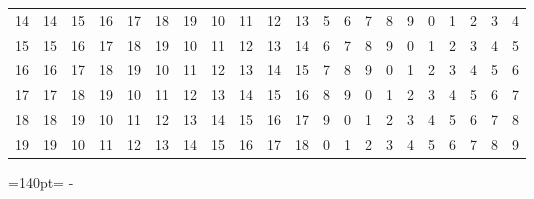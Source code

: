 \documentclass[10pt,a4paper]{article}
\newcommand{\needspace}[1]{\par\penalty-100\begingroup\dimen0=#1\relax\dimen2=\pagegoal
  \advance\dimen2-\pagetotal\ifdim\dimen0>\dimen2\relax\ifdim\dimen2>0pt\vfil\break\fi\fi
  \endgroup}
\numberwithin{equation}{section}
\begin{document}
{\begin{longtable}{@{}r|rrrrrrrrrrrrrrrrrrrr@{}}
14 & 14 & 15 & 16 & 17 & 18 & 19 & 10 & 11 & 12 & 13 & 5 & 6 & 7 & 8 & 9 & 0 & 1 & 2 & 3 & 4\\
15 & 15 & 16 & 17 & 18 & 19 & 10 & 11 & 12 & 13 & 14 & 6 & 7 & 8 & 9 & 0 & 1 & 2 & 3 & 4 & 5\\
16 & 16 & 17 & 18 & 19 & 10 & 11 & 12 & 13 & 14 & 15 & 7 & 8 & 9 & 0 & 1 & 2 & 3 & 4 & 5 & 6\\
17 & 17 & 18 & 19 & 10 & 11 & 12 & 13 & 14 & 15 & 16 & 8 & 9 & 0 & 1 & 2 & 3 & 4 & 5 & 6 & 7\\
18 & 18 & 19 & 10 & 11 & 12 & 13 & 14 & 15 & 16 & 17 & 9 & 0 & 1 & 2 & 3 & 4 & 5 & 6 & 7 & 8\\*
19 & 19 & 10 & 11 & 12 & 13 & 14 & 15 & 16 & 17 & 18 & 0 & 1 & 2 & 3 & 4 & 5 & 6 & 7 & 8 & 9\\
\bottomrule\end{longtable}}
\needspace{140pt}
\end{document}
